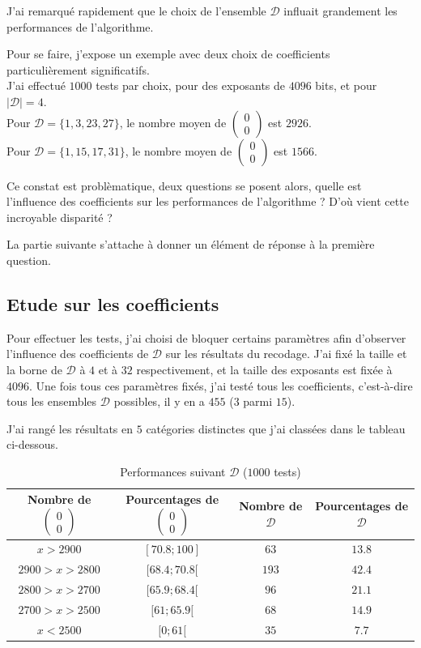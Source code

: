 \documentclass[12pt, a4paper]{memoir}
\newcommand{\doublezero}{\begin{pmatrix} 0 \\ 0 \end{pmatrix}}
\begin{document}
  J'ai remarqué rapidement que le choix de l'ensemble $\mathcal{D}$ influait grandement les performances de l'algorithme.
  
  Pour se faire, j'expose un exemple avec deux choix de coefficients particulièrement significatifs. \\
  J'ai effectué $1000$ tests par choix, pour des exposants de $4096$ bits, et pour $|\mathcal{D}| = 4$. \\
  Pour $\mathcal{D} = \{1,3,23,27\}$, le nombre moyen de $\doublezero$ est $2926$. \\
  Pour $\mathcal{D} = \{1,15,17,31\}$, le nombre moyen de $\doublezero$ est $1566$.
  
  Ce constat est problèmatique, deux questions se posent alors, quelle est l'influence des coefficients sur 
  les performances de l'algorithme ? D'où vient cette incroyable disparité ?
  
  La partie suivante s'attache à donner un élément de réponse à la première question.
  
  \subsection{Etude sur les coefficients}
  
  Pour effectuer les tests, j'ai choisi de bloquer certains paramètres afin d'observer l'influence des coefficients
  de $\mathcal{D}$ sur les résultats du recodage. J'ai fixé la taille et la borne de $\mathcal{D}$ à $4$ et 
  à $32$ respectivement, et la taille des exposants est fixée à $4096$. Une fois tous ces paramètres fixés, j'ai
  testé tous les coefficients, c'est-à-dire tous les ensembles $\mathcal{D}$ possibles, 
  il y en a $455$ ($3$ parmi $15$).
  
  J'ai rangé les résultats en $5$ catégories distinctes que j'ai classées dans le tableau ci-dessous.
  
\begin{table}[htbp]
\caption{Performances suivant $\mathcal{D}$ ($1000$ tests) }
\begin{center}
\begin{tabular}{cccc}
\toprule
Nombre de $\doublezero$ & Pourcentages de $\doublezero$ & Nombre de $\mathcal{D}$ & Pourcentages de $\mathcal{D}$ \\
\midrule
$x > 2900$ & $[70.8;100]$ & $63$  & $13.8$ \\
$2900 > x > 2800$ & $[68.4;70.8[$ & $193$ & $42.4$ \\
$2800 > x > 2700$ & $[65.9;68.4[$ & $96$ & $21.1$ \\
$2700 > x > 2500$ & $[61;65.9[$ & $68$ & $14.9$ \\
$x < 2500$ & $[0;61[$ & $35$ & $7.7$ \\
\bottomrule
\end{tabular}
\end{center}
\label{tab:example}
\end{table}%
\end{document}
